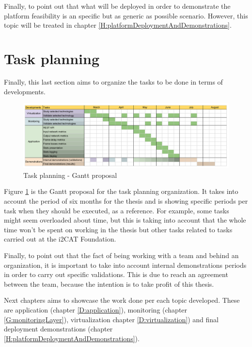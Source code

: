 Finally, to point out that what will be deployed in order to demonstrate the platform feasibility is an specific but as generic as possible scenario. However, this topic will be treated in chapter \ref{H:platformDeploymentAndDemonstrations}.


\section{Task planning}

Finally, this last section aims to organize the tasks to be done in terms of developments. 

\begin{figure}[!htb]
\begin{center}
\includegraphics[width=1\textwidth]{./images/gantt.png}
\caption{Task planning - Gantt proposal}
\label{F:tpgp}
\end{center}
\end{figure}

Figure \ref{F:tpgp} is the Gantt proposal for the task planning organization. It takes into account the period of six months for the thesis and is showing specific periods per task when they should be executed, as a reference. For example, some tasks might seem overloaded about time, but this is taking into account that the whole time won't be spent on working in the thesis but other tasks related to tasks carried out at the i2CAT Foundation.

Finally, to point out that the fact of being working with a team and behind an organization, it is important to take into account internal demonstrations periods in order to carry out specific validations. This is due to reach an agreement between the team, because the intention is to take profit of this thesis.

Next chapters aims to showcase the work done per each topic developed. These are application (chapter \ref{D:application}), monitoring (chapter \ref{G:monitoringLayer}), virtualization chapter \ref{D:virtualization}) and final deployment demonstrations (chapter \ref{H:platformDeploymentAndDemonstrations}). 
